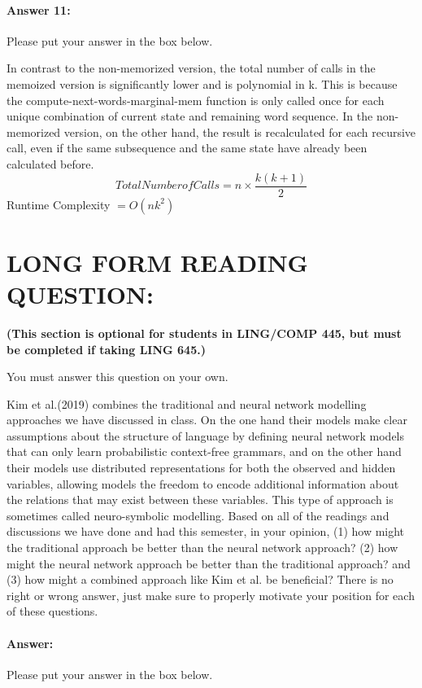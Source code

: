 \documentclass[10pt]{article}
\newenvironment{AnswerBox}{\begin{mdframed}[style=simple]}{\end{mdframed}}
\begin{document}
\paragraph{Answer 11:} Please put your answer in the box below.

\begin{AnswerBox}%

    In contrast to the non-memorized version, the total number of calls in the memoized version is significantly lower and is polynomial in k. This is because the compute-next-words-marginal-mem function is only called once for each unique combination of current state and remaining word sequence. In the non-memorized version, on the other hand, the result is recalculated for each recursive call, even if the same subsequence and the same state have already been calculated before.
    \begin{equation}
      Total Number of Calls = n \times \frac{k(k + 1)}{2}
    \end{equation}
    Runtime Complexity $ = O(nk^2)$

\end{AnswerBox}%


\newpage
\section*{LONG FORM READING QUESTION:} 
\textbf{(This section is optional for students in LING/COMP 445, but must be completed if taking LING 645.)}

You must answer this question on your own.

Kim et al.(2019) combines the traditional and neural network modelling approaches we have discussed in class. On the one hand their models make clear assumptions about the structure of language by defining neural network models that can only learn probabilistic context-free grammars, and on the other hand their models use distributed representations for both the observed and hidden variables, allowing models the freedom to encode additional information about the relations that may exist between these variables. This type of approach is sometimes called neuro-symbolic modelling. Based on all of the readings and discussions we have done and had this semester, in your opinion, (1) how might the traditional approach be better than the neural network approach? (2) how might the neural network approach be better than the traditional approach? and (3) how might a combined approach like Kim et al. be beneficial? There is no right or wrong answer, just make sure to properly motivate your position for each of these questions.

\paragraph{Answer:} Please put your answer in the box below.

\begin{AnswerBox}%


\end{AnswerBox}%
\end{document}
